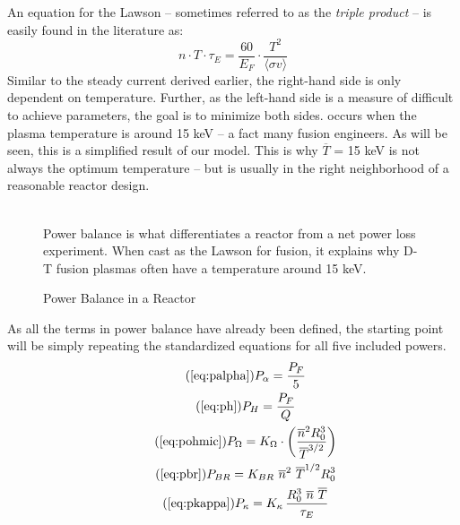 An equation for the Lawson  -- sometimes referred to as the \emph{triple product} -- is easily found in the literature as:\cite{jeff}
\begin{equation}
	\label{eq:lawson}
	n \cdot T \cdot \tau_E = \frac{ 60 }{ E_F } \cdot \frac{ T ^ 2 }{ \langle \sigma v \rangle }
\end{equation}
Similar to the steady current derived earlier, the right-hand side is only dependent on temperature. Further, as the left-hand side is a measure of difficult to achieve parameters, the goal is to minimize both sides.  occurs when the plasma temperature is around 15 keV -- a fact  many fusion engineers. As will be seen, this is a simplified result of our model. This is why \linebreak $\overline T$ = 15 keV is not always the optimum temperature -- but is usually in the right neighborhood of a reasonable reactor design.

\begin{figure}
	\centering
	\begin{adjustbox}{width=0.75\textwidth}
		
	\end{adjustbox}
	\caption{Power Balance in a Reactor} ~\\
	\small Power balance is what differentiates a reactor from a net power loss experiment. When cast as the Lawson  for fusion, it explains why D-T fusion plasmas often have a temperature around 15 keV.
	\label{fig:lawson}
\end{figure}

As all the terms in power balance have already been defined, the starting point will be simply repeating the standardized equations for all five included powers.
\begin{gather}
	\tag{\ref{eq:palpha}}
	P_\alpha = \frac{P_F}{5} \\
	\tag{\ref{eq:ph}}
	P_H = \frac{P_F}{Q} \\
	\tag{\ref{eq:pohmic}}
	P_\Omega = K_\Omega \cdot \left( \frac{ \overline n ^ 2 R_0^3 }{\overline T ^ {3/2}} \right) \\
	\tag{\ref{eq:pbr}}
	P_{BR} = K_{BR} \ \overline n ^ 2 \ \overline T ^ {1/2} R_0^3 \\
	\tag{\ref{eq:pkappa}}
	P_\kappa = K_\kappa \, \frac{ R_0 ^ 3 \ \overline{n}  \ \overline{T}  }{\tau_E}
\end{gather}

